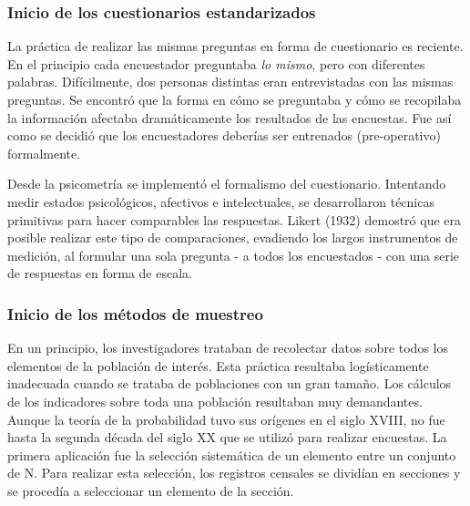 \documentclass[
  10pt,
  spanish,
]{book}
\begin{document}
\hypertarget{inicio-de-los-cuestionarios-estandarizados}{%
\subsubsection*{Inicio de los cuestionarios estandarizados}\label{inicio-de-los-cuestionarios-estandarizados}}

La práctica de realizar las mismas preguntas en forma de cuestionario es reciente. En el principio cada encuestador preguntaba \emph{lo mismo}, pero con diferentes palabras. Difícilmente, dos personas distintas eran entrevistadas con las mismas preguntas. Se encontró que la forma en cómo se preguntaba y cómo se recopilaba la información afectaba dramáticamente los resultados de las encuestas. Fue así como se decidió que los encuestadores deberías ser entrenados (pre-operativo) formalmente.

Desde la psicometría se implementó el formalismo del cuestionario. Intentando medir estados psicológicos, afectivos e intelectuales, se desarrollaron técnicas primitivas para hacer comparables las respuestas. Likert (1932) demostró que era posible realizar este tipo de comparaciones, evadiendo los largos instrumentos de medición, al formular una sola pregunta - a todos los encuestados - con una serie de respuestas en forma de escala.

\hypertarget{inicio-de-los-muxe9todos-de-muestreo}{%
\subsubsection*{Inicio de los métodos de muestreo}\label{inicio-de-los-muxe9todos-de-muestreo}}

En un principio, los investigadores trataban de recolectar datos sobre todos los elementos de la población de interés. Esta práctica resultaba logísticamente inadecuada cuando se trataba de poblaciones con un gran tamaño. Los cálculos de los indicadores sobre toda una población resultaban muy demandantes. Aunque la teoría de la probabilidad tuvo sus orígenes en el siglo XVIII, no fue hasta la segunda década del siglo XX que se utilizó para realizar encuestas. La primera aplicación fue la selección sistemática de un elemento entre un conjunto de N. Para realizar esta selección, los registros censales se dividían en secciones y se procedía a seleccionar un elemento de la sección.
\end{document}
